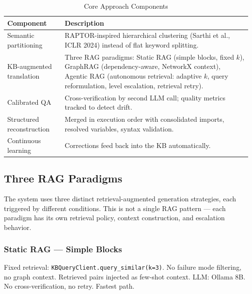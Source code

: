 \documentclass[11pt,a4paper]{article}
\begin{document}
\begin{table}[H]
\centering
\caption{Core Approach Components}
\renewcommand{\arraystretch}{1.3}
\begin{tabularx}{\textwidth}{@{} l X @{}}
\toprule
\textbf{Component} & \textbf{Description} \\
\midrule
Semantic partitioning & RAPTOR-inspired hierarchical clustering (Sarthi et al., ICLR 2024) instead of flat keyword splitting. \\
KB-augmented translation & Three RAG paradigms: Static RAG (simple blocks, fixed $k$), GraphRAG (dependency-aware, NetworkX context), Agentic RAG (autonomous retrieval: adaptive $k$, query reformulation, level escalation, retrieval retry). \\
Calibrated QA & Cross-verification by second LLM call; quality metrics tracked to detect drift. \\
Structured reconstruction & Merged in execution order with consolidated imports, resolved variables, syntax validation. \\
Continuous learning & Corrections feed back into the KB automatically. \\
\bottomrule
\end{tabularx}
\end{table}

\subsection{Three RAG Paradigms}

The system uses three distinct retrieval-augmented generation strategies, each triggered by different conditions. This is not a single RAG pattern — each paradigm has its own retrieval policy, context construction, and escalation behavior.

\subsubsection{Static RAG — Simple Blocks}

\begin{infobox}
Fixed retrieval: \texttt{KBQueryClient.query\_similar(k=3)}. No failure mode filtering, no graph context. Retrieved pairs injected as few-shot context. LLM: Ollama 8B. No cross-verification, no retry. Fastest path.
\end{infobox}
\end{document}

